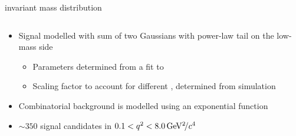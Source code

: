 \documentclass[aspectratio=1610]{beamer}
\begin{document}
\begin{frame}{\mkpimm invariant mass distribution}

\begin{columns}
\begin{column}{0.6\textwidth}
\begin{itemize}
  \item Signal modelled with sum of two Gaussians with power-law tail on the low-mass side
  \begin{itemize}
    \item Parameters determined from a fit to \BdToJPsiKst
    \item Scaling factor to account for different \mkpi, \qsq determined from simulation
  \end{itemize}
  \item Combinatorial background is modelled using an exponential function
  \item $\sim 350$ signal candidates in $0.1<{q^2}<8.0{\mathrm{\,Ge\kern -0.1em V^2\!/}c^4}$
\end{itemize}


\end{column}
\end{columns}
\end{frame}
\end{document}
